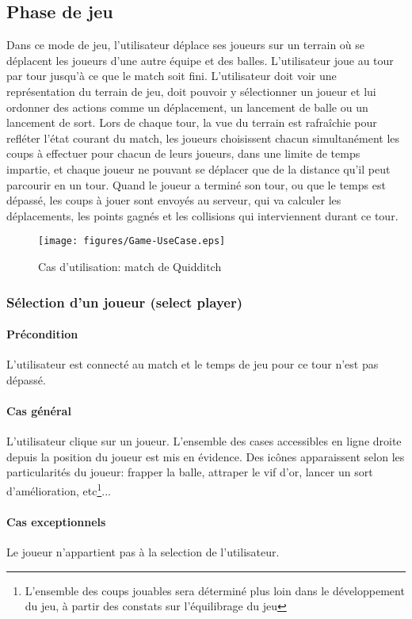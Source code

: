 \subsection{Phase de jeu}
Dans ce mode de jeu, l'utilisateur déplace ses joueurs sur un terrain où se
déplacent les joueurs d'une autre équipe et des balles. L'utilisateur joue au
tour par tour jusqu'à ce que le match soit fini. L'utilisateur doit voir une 
représentation du terrain de jeu, doit pouvoir y sélectionner un joueur et lui 
ordonner des actions comme un déplacement, un lancement de balle ou un lancement 
de sort. Lors de chaque tour, la vue du terrain est rafraîchie pour refléter 
l'état courant du match, les joueurs choisissent chacun simultanément les coups
à effectuer pour chacun de leurs joueurs, dans une limite de temps impartie, et 
chaque joueur ne pouvant se déplacer que de la distance qu'il peut parcourir en
un tour. Quand le joueur a terminé  son tour, ou que le temps est dépassé, les
coups à jouer sont envoyés au serveur, qui va calculer les déplacements, les 
points gagnés et les collisions qui interviennent durant ce tour.

\begin{figure}[h!]
    \centering
    \texttt{[image: figures/Game-UseCase.eps]}
    \caption{\label{fig:UC:game} Cas d'utilisation: match de Quidditch}
\end{figure}

\subsubsection{Sélection d'un joueur (select player)}
    \label{UC:selectPlayerOnPitch}
    \paragraph{Précondition} L'utilisateur est connecté au match et le temps de jeu pour ce tour n'est pas dépassé.
    \paragraph{Cas général} L'utilisateur clique sur un joueur. L'ensemble des cases accessibles en ligne droite depuis la position du joueur est mis en évidence. Des icônes apparaissent selon les particularités du joueur: frapper la balle, attraper le vif d'or, lancer un sort d'amélioration, etc\footnote{L'ensemble des coups jouables sera déterminé plus loin dans le développement du jeu, à partir des constats sur l'équilibrage du jeu}...
    \paragraph{Cas exceptionnels} Le \gls{joueur} n'appartient pas à la \gls{selection} de l'\gls{utilisateur}.
